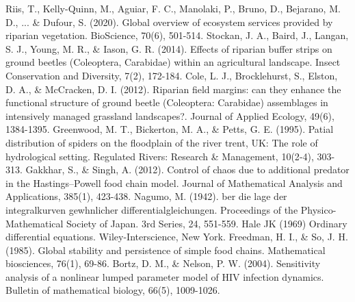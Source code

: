 \documentclass[12pt]{article}
\numberwithin{equation}{section}
\begin{document}
\begin{thebibliography}{99}
  Riis, T., Kelly-Quinn, M., Aguiar, F. C., Manolaki, P., Bruno, D., Bejarano, M. D., ... \& Dufour, S. (2020). Global overview of ecosystem services provided by riparian vegetation. BioScience, 70(6), 501-514.
  Stockan, J. A., Baird, J., Langan, S. J., Young, M. R., \& Iason, G. R. (2014). Effects of riparian buffer strips on ground beetles (Coleoptera, Carabidae) within an agricultural landscape. Insect Conservation and Diversity, 7(2), 172-184.
  Cole, L. J., Brocklehurst, S., Elston, D. A., \& McCracken, D. I. (2012). Riparian field margins: can they enhance the functional structure of ground beetle (Coleoptera: Carabidae) assemblages in intensively managed grassland landscapes?. Journal of Applied Ecology, 49(6), 1384-1395.
  Greenwood, M. T., Bickerton, M. A., \& Petts, G. E. (1995). Patial distribution of spiders on the floodplain of the river trent, UK: The role of hydrological setting. Regulated Rivers: Research \& Management, 10(2‐4), 303-313.
  Gakkhar, S., \& Singh, A. (2012). Control of chaos due to additional predator in the Hastings–Powell food chain model. Journal of Mathematical Analysis and Applications, 385(1), 423-438.
  Nagumo, M. (1942). ber die lage der integralkurven gewhnlicher differentialgleichungen. Proceedings of the Physico-Mathematical Society of Japan. 3rd Series, 24, 551-559.
  Hale JK (1969) Ordinary differential equations. Wiley-Interscience, New York.
  Freedman, H. I., \& So, J. H. (1985). Global stability and persistence of simple food chains. Mathematical biosciences, 76(1), 69-86.
  Bortz, D. M., \& Nelson, P. W. (2004). Sensitivity analysis of a nonlinear lumped parameter model of HIV infection dynamics. Bulletin of mathematical biology, 66(5), 1009-1026.
\end{thebibliography}
\end{document}
